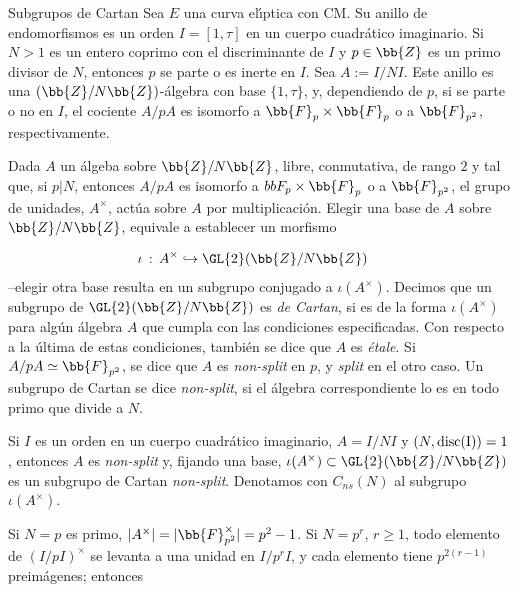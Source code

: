 \begin{subsection}{Subgrupos de Cartan}
Sea $E$ una curva el\'{\i}ptica con CM. Su anillo de endomorfismos es un orden
$I=[1,\tau]$ en un cuerpo cuadr\'{a}tico imaginario. Si $N>1$ es un entero coprimo
con el discriminante de $I$ y $p\in\bb{Z}$ es un primo divisor de $N$, entonces
$p$ se parte o es inerte en $I$. Sea $A:=I/NI$. Este anillo es una
$(\bb{Z}/N\bb{Z})$-\'{a}lgebra con base $\{1,\tau\}$, y, dependiendo de $p$, si se
parte o no en $I$, el cociente $A/pA$ es isomorfo a $\bb{F}_{p}\times\bb{F}_{p}$
o a $\bb{F}_{p^{2}}$, respectivamente.

\begin{defSubgrupoDeCartan}
Dada $A$ un \'{a}lgeba sobre $\bb{Z}/N\bb{Z}$, libre, conmutativa, de rango $2$ y
tal que, si $p|N$, entonces $A/pA$ es isomorfo a $bb{F}_{p}\times\bb{F}_{p}$ o a
$\bb{F}_{p^{2}}$, el grupo de unidades, $A^{\times}$, act\'{u}a sobre $A$ por
multiplicaci\'{o}n. Elegir una base de $A$ sobre $\bb{Z}/N\bb{Z}$, equivale a
establecer un morfismo

\begin{align*}
\iota & \,:\,A^{\times}\hookrightarrow\GL{2}(\bb{Z}/N\bb{Z})
\end{align*}
--elegir otra base resulta en un subgrupo conjugado a $\iota(A^{\times})$.
Decimos que un subgrupo de $\GL{2}(\bb{Z}/N\bb{Z})$ es \emph{de Cartan}, si es de
la forma $\iota(A^{\times})$ para alg\'{u}n \'{a}lgebra $A$ que cumpla con las
condiciones especificadas. Con respecto a la \'{u}ltima de estas condiciones,
tambi\'{e}n se dice que $A$ es \textit{\'{e}tale}. Si $A/pA\simeq\bb{F}_{p^{2}}$,
se dice que $A$ es \textit{non-split} en $p$, y \textit{split} en el otro caso.
Un subgrupo de Cartan se dice \textit{non-split}, si el \'{a}lgebra correspondiente
lo es en todo primo que divide a $N$.

\end{defSubgrupoDeCartan}

\begin{ejemploSubgrupoDeCartan}
Si $I$ es un orden en un cuerpo cuadr\'{a}tico imaginario, $A=I/NI$ y
$(N,\rm{disc}(I))=1$, entonces $A$ es \textit{non-split} y, fijando una base,
$\iota(A^{\times})\subset\GL{2}(\bb{Z}/N\bb{Z})$ es un subgrupo de Cartan
\textit{non-split}. Denotamos con $C_{ns}(N)$ al subgrupo $\iota(A^{\times})$.

Si $N=p$ es  primo, $|A^{\times}|=|\bb{F}_{p^{2}}^{\times}|=p^{2}-1$.
Si $N=p^{r}$, $r\geq 1$, todo elemento de $(I/pI)^{\times}$ se levanta a una
unidad en $I/p^{r}I$, y cada elemento tiene $p^{2(r-1)}$ preim\'{a}genes;
entonces


\end{ejemploSubgrupoDeCartan}
\end{subsection}
